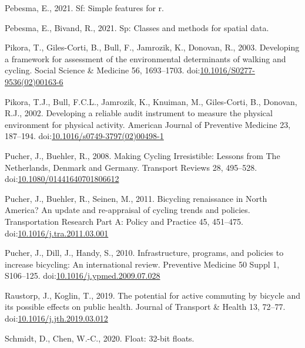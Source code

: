 \documentclass[]{elsarticle} %
\begin{document}
\leavevmode\hypertarget{ref-R-sf}{}%
Pebesma, E., 2021. Sf: Simple features for r.

\leavevmode\hypertarget{ref-R-sp}{}%
Pebesma, E., Bivand, R., 2021. Sp: Classes and methods for spatial data.

\leavevmode\hypertarget{ref-pikoraDevelopingFrameworkAssessment2003}{}%
Pikora, T., Giles-Corti, B., Bull, F., Jamrozik, K., Donovan, R., 2003.
Developing a framework for assessment of the environmental determinants
of walking and cycling. Social Science \& Medicine 56, 1693--1703.
doi:\href{https://doi.org/10.1016/S0277-9536(02)00163-6}{10.1016/S0277-9536(02)00163-6}

\leavevmode\hypertarget{ref-pikoraDevelopingReliableAudit2002}{}%
Pikora, T.J., Bull, F.C.L., Jamrozik, K., Knuiman, M., Giles-Corti, B.,
Donovan, R.J., 2002. Developing a reliable audit instrument to measure
the physical environment for physical activity. American Journal of
Preventive Medicine 23, 187--194.
doi:\href{https://doi.org/10.1016/s0749-3797(02)00498-1}{10.1016/s0749-3797(02)00498-1}

\leavevmode\hypertarget{ref-pucherMakingCyclingIrresistible2008}{}%
Pucher, J., Buehler, R., 2008. Making Cycling Irresistible: Lessons from
The Netherlands, Denmark and Germany. Transport Reviews 28, 495--528.
doi:\href{https://doi.org/10.1080/01441640701806612}{10.1080/01441640701806612}

\leavevmode\hypertarget{ref-pucherBicyclingRenaissanceNorth2011a}{}%
Pucher, J., Buehler, R., Seinen, M., 2011. Bicycling renaissance in
North America? An update and re-appraisal of cycling trends and
policies. Transportation Research Part A: Policy and Practice 45,
451--475.
doi:\href{https://doi.org/10.1016/j.tra.2011.03.001}{10.1016/j.tra.2011.03.001}

\leavevmode\hypertarget{ref-pucherInfrastructureProgramsPolicies2010a}{}%
Pucher, J., Dill, J., Handy, S., 2010. Infrastructure, programs, and
policies to increase bicycling: An international review. Preventive
Medicine 50 Suppl 1, S106--125.
doi:\href{https://doi.org/10.1016/j.ypmed.2009.07.028}{10.1016/j.ypmed.2009.07.028}

\leavevmode\hypertarget{ref-raustorpPotentialActiveCommuting2019}{}%
Raustorp, J., Koglin, T., 2019. The potential for active commuting by
bicycle and its possible effects on public health. Journal of Transport
\& Health 13, 72--77.
doi:\href{https://doi.org/10.1016/j.jth.2019.03.012}{10.1016/j.jth.2019.03.012}

\leavevmode\hypertarget{ref-R-float}{}%
Schmidt, D., Chen, W.-C., 2020. Float: 32-bit floats.
\end{document}
